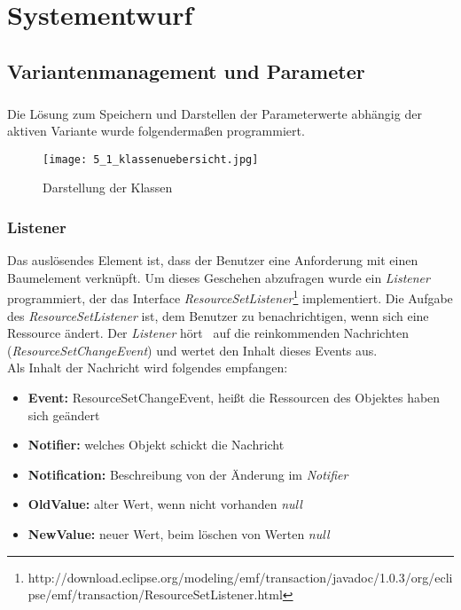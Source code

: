 \chapter{Systementwurf}\label{chp:systementwurf}


\section{Variantenmanagement und Parameter}
\paragraph{}

Die Lösung zum Speichern und Darstellen der Parameterwerte abhängig der aktiven Variante wurde folgendermaßen programmiert.\\

\begin{figure}[h!]
  \begin{center}
    \texttt{[image: 5\_1\_klassenuebersicht.jpg]}
  		  \caption{Darstellung der Klassen}
     \label{ttn.verbindung.klassen.loesung}
  \end{center}
\end{figure}



\subsection{Listener}
Das auslösendes Element ist, dass der Benutzer eine Anforderung mit einen Baumelement verknüpft. Um dieses Geschehen abzufragen wurde ein \textit{Listener} programmiert, der das Interface \textit{ResourceSetListener}\footnote{http://download.eclipse.org/modeling/emf/transaction/javadoc/1.0.3/org/eclipse/emf/transaction/ResourceSetListener.html} implementiert. Die Aufgabe des \textit{ResourceSetListener} ist, dem Benutzer zu benachrichtigen, wenn sich eine Ressource ändert. Der \textit{Listener}  \glqq hört\grqq~ auf die reinkommenden Nachrichten (\textit{ResourceSetChangeEvent}) und wertet den Inhalt dieses Events aus.\\

Als Inhalt der Nachricht wird folgendes empfangen: 

\begin{itemize}
\item \textbf{Event: }ResourceSetChangeEvent, heißt die Ressourcen des Objektes haben sich geändert
\item \textbf{Notifier: } welches Objekt schickt die Nachricht
\item \textbf{Notification: }Beschreibung von der Änderung im \textit{Notifier}
\item \textbf{OldValue: } alter Wert, wenn nicht vorhanden \textit{null}
\item \textbf{NewValue: } neuer Wert, beim löschen von Werten \textit{null}
\end{itemize}

